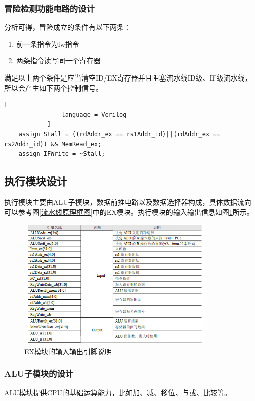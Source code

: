 \documentclass{../source/zjureport}
\begin{document}
            \subsubsection{冒险检测功能电路的设计}
            分析可得，冒险成立的条件有以下两条：
            \begin{enumerate}
                \item 前一条指令为lw指令
                \item 两条指令读写同一个寄存器
            \end{enumerate}
            满足以上两个条件是应当清空ID/EX寄存器并且阻塞流水线ID级、IF级流水线，所以会产生如下两个控制信号。
            \begin{lstlisting}[
                language = Verilog
            ]
    assign Stall = ((rdAddr_ex == rs1Addr_id)||(rdAddr_ex == rs2Addr_id)) && MemRead_ex;
    assign IFWrite = ~Stall;
            \end{lstlisting}

        \subsection{执行模块设计}
        执行模块主要由ALU子模块，数据前推电路以及数据选择器构成，具体数据流向可以参考图\ref{流水线原理框图}中的EX模块。执行模块的输入输出信息如图\ref{EX模块输入输出引脚说明}所示。
        \begin{figure}[H]
            \centering
            \includegraphics[width = 0.85\textwidth]{figure/执行模块输入输出引脚说明.png}
            \caption{EX模块的输入输出引脚说明}
            \label{EX模块输入输出引脚说明}
        \end{figure}

            \subsubsection{ALU子模块的设计}
            ALU模块提供CPU的基础运算能力，比如加、减、移位、与或、比较等。
\end{document}
